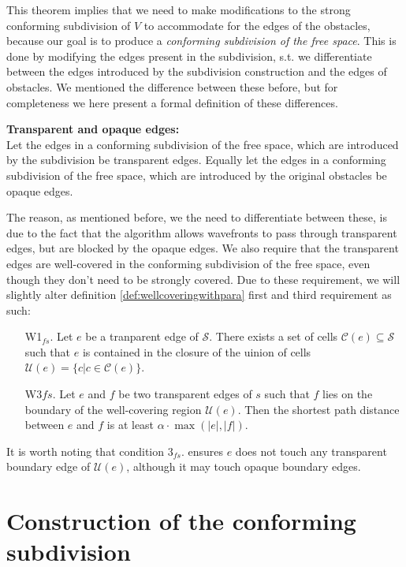 This theorem implies that we need to make modifications to the strong conforming 
subdivision of $V$ to accommodate for the edges of the obstacles, because our goal is 
to produce a \textit{conforming subdivision of the free space}. This is done by 
modifying the edges present in the subdivision, s.t. we differentiate between the edges 
introduced by the subdivision construction and the edges of obstacles. We mentioned the 
difference between these before, but for completeness we here present a formal 
definition of these differences.

\begin{mydef}\textbf{Transparent and opaque edges:}\\
    Let the edges in a conforming subdivision of the free space, which are introduced by 
    the subdivision be transparent edges. Equally let the edges in a conforming 
    subdivision of the free space, which are introduced by the original obstacles be 
    opaque edges. 
\end{mydef}

The reason, as mentioned before, we the need to differentiate between these, is due to the 
fact that the algorithm allows wavefronts to pass through transparent edges, but are blocked 
by the opaque edges. We also require that the transparent edges are well-covered in the 
conforming subdivision of the free space, even though they don't need to be strongly 
covered. Due to these requirement, we will slightly alter definition 
\ref{def:wellcoveringwithpara} first and third requirement as such:

\begin{enumerate}
\item[W1$_{fs}$.] Let $e$ be a tranparent edge of $\mathcal{S}$. There exists a set of 
cells $\mathcal{C}(e)\subseteq\mathcal{S}$ such that $e$ is contained in the closure 
of the uinion of cells $\mathcal{U}(e)=\{c|c\in\mathcal{C}(e)\}$.
\item[W3${fs}$.] Let $e$ and $f$ be two transparent edges of $s$ such that $f$ lies on 
the boundary of the well-covering region $\mathcal{U}(e)$. Then the shortest path 
distance between $e$ and $f$ is at least $\alpha\cdot\max(|e|,|f|)$. 
\end{enumerate}

It is worth noting that condition $3_{fs}.$ ensures $e$ does not touch any transparent 
boundary edge of $\mathcal{U}(e)$, although it may touch opaque boundary edges.

\section{Construction of the conforming subdivision}

